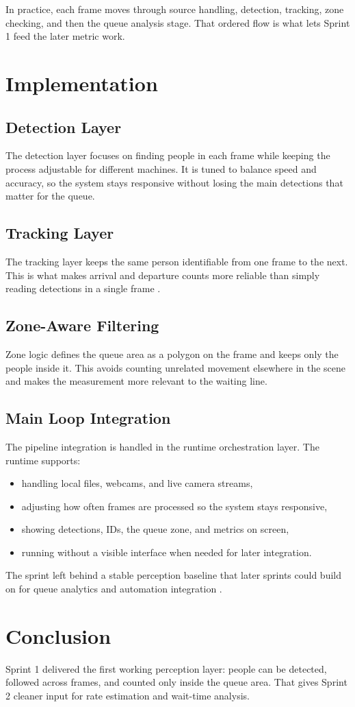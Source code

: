 In practice, each frame moves through source handling, detection, tracking, zone checking, and then the queue analysis stage. That ordered flow is what lets Sprint 1 feed the later metric work.

\section{Implementation}
\subsection{Detection Layer}
The detection layer focuses on finding people in each frame while keeping the process adjustable for different machines. It is tuned to balance speed and accuracy, so the system stays responsive without losing the main detections that matter for the queue.

\subsection{Tracking Layer}
The tracking layer keeps the same person identifiable from one frame to the next. This is what makes arrival and departure counts more reliable than simply reading detections in a single frame \cite{bytetrack2022}.

\subsection{Zone-Aware Filtering}
Zone logic defines the queue area as a polygon on the frame and keeps only the people inside it. This avoids counting unrelated movement elsewhere in the scene and makes the measurement more relevant to the waiting line.

\subsection{Main Loop Integration}
The pipeline integration is handled in the runtime orchestration layer. The runtime supports:
\begin{itemize}
    \item handling local files, webcams, and live camera streams,
    \item adjusting how often frames are processed so the system stays responsive,
    \item showing detections, IDs, the queue zone, and metrics on screen,
    \item running without a visible interface when needed for later integration.
\end{itemize}

The sprint left behind a stable perception baseline that later sprints could build on for queue analytics and automation integration \cite{opencv_docs}.

\section{Conclusion}
Sprint 1 delivered the first working perception layer: people can be detected, followed across frames, and counted only inside the queue area. That gives Sprint 2 cleaner input for rate estimation and wait-time analysis.
